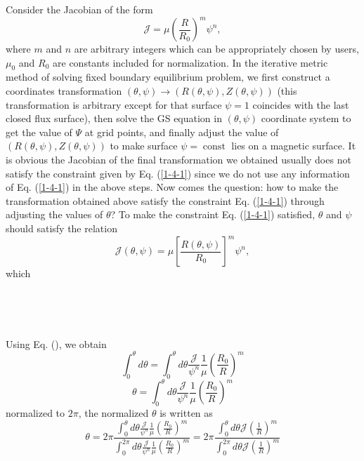 \documentclass{llncs}
\newcommand{\tmop}[1]{\ensuremath{\operatorname{#1}}}
\begin{document}
Consider the Jacobian of the form
\begin{equation}
  \label{1-4-1} \mathcal{J}= \mu \left( \frac{R}{R_0} \right)^m \psi^n,
\end{equation}
where $m$ and $n$ are arbitrary integers which can be appropriately chosen by
users, $\mu_0$ and $R_0$ are constants included for normalization. In the
iterative metric method of solving fixed boundary equilibrium problem, we
first construct a coordinates transformation $(\theta, \psi) \rightarrow (R
(\theta, \psi), Z (\theta, \psi))$ (this transformation is arbitrary except
for that surface $\psi = 1$ coincides with the last closed flux surface), then
solve the GS equation in $(\theta, \psi)$ coordinate system to get the value
of $\Psi$ at grid points, and finally adjust the value of $(R (\theta, \psi),
Z (\theta, \psi))$ to make surface $\psi = \tmop{const}$ lies on a magnetic
surface. It is obvious the Jacobian of the final transformation we obtained
usually does not satisfy the constraint given by Eq. (\ref{1-4-1}) since we do
not use any information of Eq. (\ref{1-4-1}) in the above steps. Now comes the
question: how to make the transformation obtained above satisfy the constraint
Eq. (\ref{1-4-1}) through adjusting the values of $\theta$? To make the
constraint Eq. (\ref{1-4-1}) satisfied, $\theta$ and $\psi$ should satisfy the
relation
\begin{equation}
  \mathcal{J} (\theta, \psi) = \mu \left[ \frac{R (\theta, \psi)}{R_0}
  \right]^m \psi^n,
\end{equation}
which

\

\

Using Eq. (), we obtain
\[ \int_0^{\theta} d \theta = \int_0^{\theta} d \theta
   \frac{\mathcal{J}}{\psi^n} \frac{1}{\mu} \left( \frac{R_0}{R} \right)^m \]
\begin{equation}
  \theta = \int_0^{\theta} d \theta \frac{\mathcal{J}}{\psi^n} \frac{1}{\mu}
  \left( \frac{R_0}{R} \right)^m
\end{equation}
normalized to $2 \pi$, the normalized $\theta$ is written as
\begin{equation}
  \theta = 2 \pi \frac{\int_0^{\theta} d \theta \frac{\mathcal{J}}{\psi^n}
  \frac{1}{\mu} \left( \frac{R_0}{R} \right)^m}{\int_0^{2 \pi} d \theta
  \frac{\mathcal{J}}{\psi^n} \frac{1}{\mu} \left( \frac{R_0}{R} \right)^m} = 2
  \pi \frac{\int_0^{\theta} d \theta \mathcal{J} \left( \frac{1}{R}
  \right)^m}{\int_0^{2 \pi} d \theta \mathcal{J} \left( \frac{1}{R} \right)^m}
\end{equation}
\end{document}
